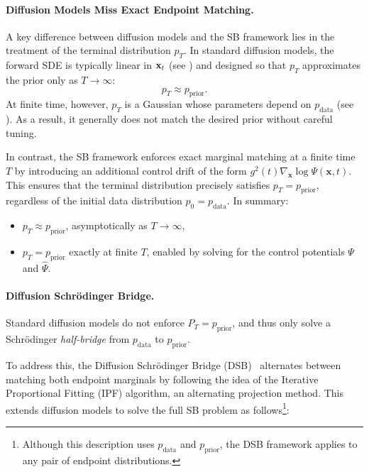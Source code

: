 \paragraph{Diffusion Models Miss Exact Endpoint Matching.}
A key difference between diffusion models and the SB framework lies in the treatment of the terminal distribution $p_T$. In standard diffusion models, the forward SDE is typically linear in ${\mathbf{x}}_t$ (see ) and designed so that $p_T$ approximates the  prior only as $T \to \infty$:
\[
    p_T \approx p_{\mathrm{prior}}.
\]
At finite time, however, $p_T$ is a Gaussian whose parameters depend on $p_{\text{data}}$ (see ). As a result, it generally does not match the desired prior without careful tuning.



In contrast, the SB framework enforces exact marginal matching at a finite time $T$ by introducing an additional control drift of the form $g^2(t)\nabla_\mathbf{x}\log \Psi(\mathbf{x}, t)$. This ensures that the terminal distribution precisely satisfies $p_T = p_{\mathrm{prior}}$, regardless of the initial data distribution $p_0 = p_{\mathrm{data}}$. In summary:
\begin{itemize}
    \item {} $p_T \approx p_{\mathrm{prior}}$, asymptotically as $T \to \infty$,
    \item {} $p_T = p_{\mathrm{prior}}$ exactly at finite $T$, enabled by solving for the control potentials $\Psi$ and $\widehat{\Psi}$.
\end{itemize}

\paragraph{Diffusion Schrödinger Bridge.} 
Standard diffusion models do not enforce $P_T = p_{\mathrm{prior}}$, and thus only solve a Schrödinger \emph{half-bridge} from $p_{\mathrm{data}}$ to $p_{\mathrm{prior}}$.

To address this, the Diffusion Schrödinger Bridge (DSB)~\citep{de2021diffusion} alternates between matching both endpoint marginals by following the idea of the Iterative Proportional Fitting (IPF) algorithm, an alternating projection method. This extends diffusion models to solve the full SB problem as follows\footnote{Although this description uses $p_{\mathrm{data}}$ and $p_{\mathrm{prior}}$, the DSB framework applies to any pair of endpoint distributions.}:


